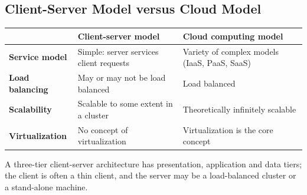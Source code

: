 \subsection{Client-Server Model versus Cloud Model}
\begin{center}
\begin{tabularx}{\textwidth}{>{\bfseries}XXX}
\toprule
 & Client-server model & Cloud computing model\\
\midrule
Service model & Simple: server services client requests & Variety of complex models (IaaS, PaaS, SaaS)\\
Load balancing & May or may not be load balanced & Load balanced\\
Scalability & Scalable to some extent in a cluster & Theoretically infinitely scalable\\
Virtualization & No concept of virtualization & Virtualization is the core concept\\
\bottomrule
\end{tabularx}
\end{center}
A three-tier client-server architecture has presentation, application and data tiers; the client is often a
thin client, and the server may be a load-balanced cluster or a stand-alone machine.


